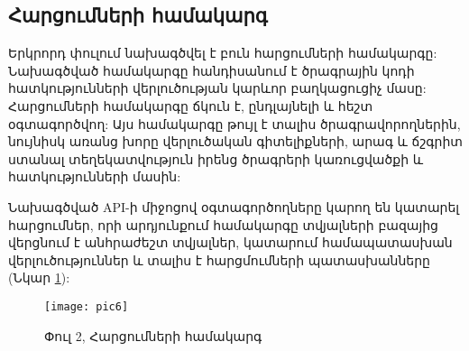 {
    \subsection{Հարցումների համակարգ}\label{subsec:queries}

    Երկրորդ փուլում նախագծվել է բուն հարցումների համակարգը:
    Նախագծված համակարգը հանդիսանում է ծրագրային կոդի հատկությունների վերլուծության կարևոր բաղկացուցիչ մասը:
    Հարցումների համակարգը ճկուն է, ընդլայնելի և հեշտ օգտագործվող:
    Այս համակարգը թույլ է տալիս ծրագրավորողներին, նույնիսկ առանց խորը վերլուծական գիտելիքների,
    արագ և ճշգրիտ ստանալ տեղեկատվություն իրենց ծրագրերի կառուցվածքի և հատկությունների մասին:

    Նախագծված API-ի միջոցով օգտագործողները կարող են կատարել հարցումներ, որի արդյունքում համակարգը տվյալների բազայից վերցնում է անհրաժեշտ
    տվյալներ, կատարում համապատասխան վերլուծություններ և տալիս է հարցմումների պատասխանները (Նկար \ref{fig:figure6}):

    \begin{figure}[h]
        \centering
        \texttt{[image: pic6]}
        \caption{Փուլ 2, Հարցումների համակարգ}
        \label{fig:figure6}
    \end{figure}

    
}